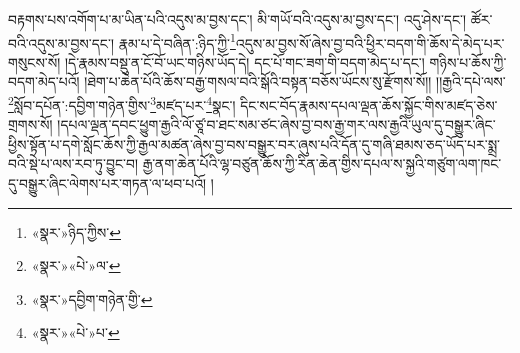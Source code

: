 བརྟགས་པས་འགོག་པ་མ་ཡིན་པའི་འདུས་མ་བྱས་དང་། མི་གཡོ་བའི་འདུས་མ་བྱས་དང་། འདུ་ཤེས་དང་། ཚོར་བའི་འདུས་མ་བྱས་དང་། རྣམ་པ་དེ་བཞིན་:ཉིད་ཀྱི་\footnote{«སྣར་»ཉིད་ཀྱིས་}འདུས་མ་བྱས་སོ་ཞེས་བྱ་བའི་ཕྱིར་བདག་གི་ཆོས་དེ་མེད་པར་གསུངས་སོ། །དེ་རྣམས་བསྡུ་ན་ངོ་བོ་ཡང་གཉིས་ཡོད་དེ། དང་པོ་གང་ཟག་གི་བདག་མེད་པ་དང་། གཉིས་པ་ཆོས་ཀྱི་བདག་མེད་པའོ། །ཐེག་པ་ཆེན་པོའི་ཆོས་བརྒྱ་གསལ་བའི་སྒོའི་བསྟན་བཅོས་ཡོངས་སུ་རྫོགས་སོ།། །།རྒྱའི་དཔེ་ལས་\footnote{«སྣར་»«པེ་»ལ་}སློབ་དཔོན་:དབྱིག་གཉེན་གྱིས་\footnote{«སྣར་»དབྱིག་གཉེན་གྱི་}མཛད་པར་\footnote{«སྣར་»«པེ་»པ་}སྣང་། དིང་སང་བོད་རྣམས་དཔལ་ལྡན་ཆོས་སྐྱོང་གིས་མཛད་ཅེས་གྲགས་སོ། །དཔལ་ལྡན་དབང་ཕྱུག་རྒྱའི་ལོ་ཙཱ་བ་ཐང་སམ་ཙང་ཞེས་བྱ་བས་རྒྱ་གར་ལས་རྒྱའི་ཡུལ་དུ་བསྒྱུར་ཞིང་ཕྱིས་སྟོན་པ་དགེ་སློང་ཆོས་ཀྱི་རྒྱལ་མཚན་ཞེས་བྱ་བས་བསྒྱུར་བར་ཞུས་པའི་དོན་དུ་གཞི་ཐམས་ཅད་ཡོད་པར་སྨྲ་བའི་སྡེ་པ་ལས་རབ་ཏུ་བྱུང་བ། རྒྱ་ནག་ཆེན་པོའི་ལྷ་བཙུན་ཆོས་ཀྱི་རིན་ཆེན་གྱིས་དཔལ་ས་སྐྱའི་གཙུག་ལག་ཁང་དུ་བསྒྱུར་ཞིང་ལེགས་པར་གཏན་ལ་ཕབ་པའོ། ། 